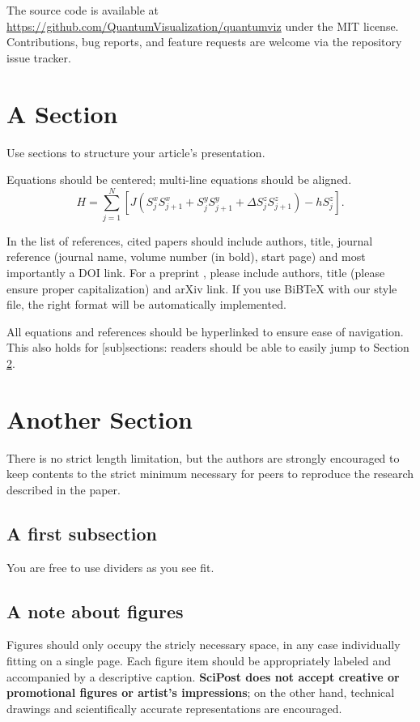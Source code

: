\documentclass{SciPost}
\begin{document}
The source code is available at
\url{https://github.com/QuantumVisualization/quantumviz} under the MIT
license.
Contributions, bug reports, and feature requests are welcome via the
repository issue tracker.


\section{A Section}
Use sections to structure your article's presentation.

Equations should be centered; multi-line equations should be aligned.
\begin{equation}
H = \sum_{j=1}^N \left[J (S^x_j S^x_{j+1} + S^y_j S^y_{j+1} + \Delta S^z_j S^z_{j+1}) - h S^z_j \right].
\end{equation}

In the list of references, cited papers \cite{1931_Bethe_ZP_71} should include authors, title, journal reference (journal name, volume number (in bold), start page) and most importantly a DOI link. For a preprint \cite{arXiv:1108.2700}, please include authors, title (please ensure proper capitalization) and arXiv link. If you use BiBTeX with our style file, the right format will be automatically implemented.

All equations and references should be hyperlinked to ensure ease of navigation. This also holds for [sub]sections: readers should be able to easily jump to Section \ref{sec:another}.

\section{Another Section}
\label{sec:another}
There is no strict length limitation, but the authors are strongly encouraged to keep contents to the strict minimum necessary for peers to reproduce the research described in the paper.

\subsection{A first subsection}
You are free to use dividers as you see fit.
\subsection{A note about figures}
Figures should only occupy the stricly necessary space, in any case individually fitting on a single page. Each figure item should be appropriately labeled and accompanied by a descriptive caption. {\bf SciPost does not accept creative or promotional figures or artist's impressions}; on the other hand, technical drawings and scientifically accurate representations are encouraged.
\end{document}

